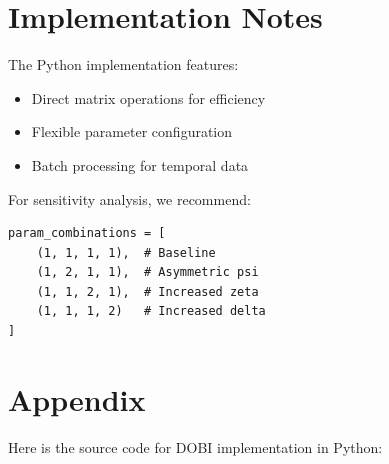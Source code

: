 \documentclass{article}
\begin{document}
\section{Implementation Notes}
The Python implementation features:
\begin{itemize}
\item Direct matrix operations for efficiency
\item Flexible parameter configuration
\item Batch processing for temporal data
\end{itemize}

For sensitivity analysis, we recommend:

\begin{verbatim}
param_combinations = [
    (1, 1, 1, 1),  # Baseline
    (1, 2, 1, 1),  # Asymmetric psi
    (1, 1, 2, 1),  # Increased zeta
    (1, 1, 1, 2)   # Increased delta
]
\end{verbatim}

\section{Appendix}
Here is the source code for DOBI implementation in Python:

\end{document}

